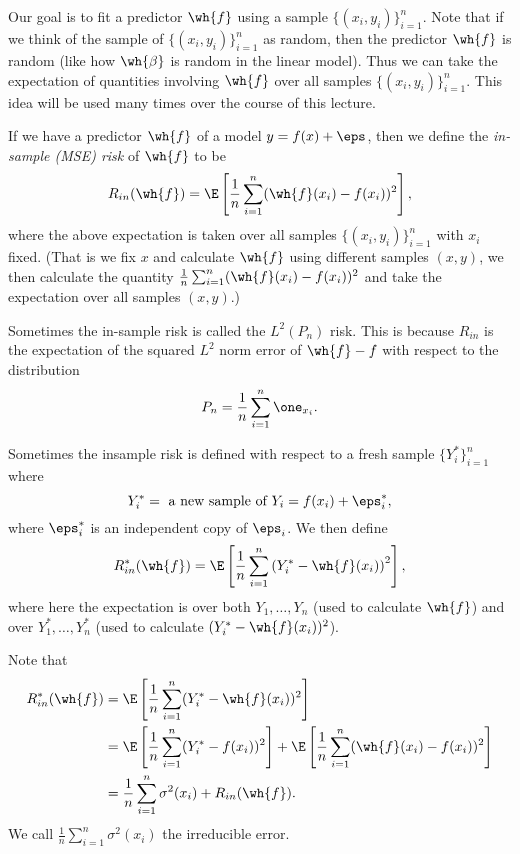 Our goal is to fit a predictor $\wh{f}$ using a sample $\{(x_i,y_i)\}_{i=1}^n$. Note that if we think of the sample of $\{(x_i,y_i)\}_{i=1}^n$ as random, then the predictor $\wh{f}$ is random (like how $\wh{\beta}$ is random in the linear model). Thus we can take the expectation of quantities involving $\wh{f}$ over all samples $\{(x_i,y_i)\}_{i=1}^n$. This idea will be used many times over the course of this lecture. 
\begin{defn}
    If we have a predictor $\wh{f}$ of a model $y = f(x)+\eps$, then we define the \emph{in-sample (MSE) risk} of $\wh{f}$ to be 
    \[R_{in}(\wh{f}) = \E\left[\frac{1}{n}\sum_{i=1}^n (\wh{f}(x_i)-f(x_i))^2\right], \]
    where the above expectation is taken over all samples $\{(x_i,y_i)\}_{i=1}^n$ with $x_i$ fixed. (That is we fix $x$ and calculate $\wh{f}$ using different samples $(x,y)$, we then calculate the quantity $\frac{1}{n}\sum_{i=1}^n (\wh{f}(x_i)-f(x_i))^2$ and take the expectation over all samples $(x,y)$.)
\end{defn}
\begin{aside}
    Sometimes the in-sample risk is called the $L^2(P_n)$ risk. This is because $R_{in}$ is the expectation of the squared $L^2$ norm error of $\wh{f}-f$ with respect to the distribution
    \[P_n = \frac{1}{n}\sum_{i=1}^n \one_{x_i}.\]
\end{aside}
\begin{defn}
    Sometimes the insample risk is defined with respect to a fresh sample $\{Y_i^*\}_{i=1}^n$ where 
    \[Y_i^* = \text{ a new sample of } Y_i = f(x_i) + \eps_i^*, \]
    where $\eps_i^*$ is an independent copy of $\eps_i$. We then define
    \[R_{in}^*(\wh{f}) = \E\left[\frac{1}{n}\sum_{i=1}^n \left(Y_i^*-\wh{f}(x_i)\right)^2\right], \]
    where here the expectation is over both $Y_1,\ldots, Y_n$ (used to calculate $\wh{f}$) and over $Y_1^*,\ldots, Y_n^*$ (used to calculate $(Y_i^*-\wh{f}(x_i))^2$).
\end{defn}
Note that 
\begin{align*}
    R^*_{in}(\wh{f}) &= \E\left[\frac{1}{n} \sum_{i=1}^n (Y_i^*-\wh{f}(x_i))^2\right]\\
    &=\E\left[\frac{1}{n} \sum_{i=1}^n (Y_i^*-f(x_i))^2\right]+\E\left[\frac{1}{n}\sum_{i=1}^n (\wh{f}(x_i)-f(x_i))^2\right]\\
    &=\frac{1}{n}\sum_{i=1}^n \sigma^2(x_i)+R_{in}(\wh{f}).
\end{align*}
We call $\frac{1}{n}\sum_{i=1}^n \sigma^2(x_i)$ the irreducible error. 

